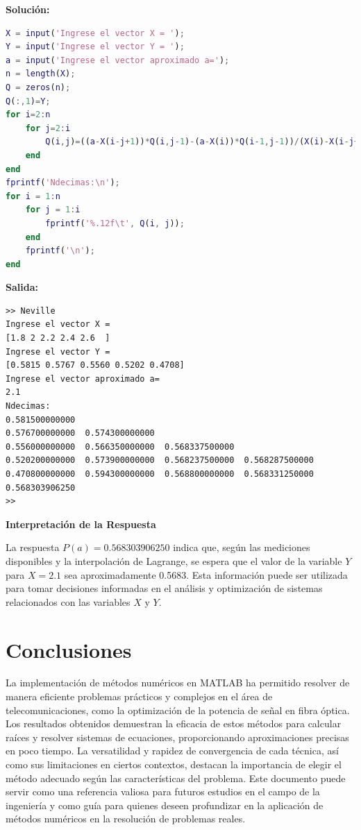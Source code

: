 \documentclass[12pt,a4paper,twoside]{article}  %
\begin{document}
\textbf{Solución:}
\begin{lstlisting}[language=Matlab]
X = input('Ingrese el vector X = ');
Y = input('Ingrese el vector Y = ');
a = input('Ingrese el vector aproximado a=');
n = length(X);
Q = zeros(n);
Q(:,1)=Y;
for i=2:n
    for j=2:i
        Q(i,j)=((a-X(i-j+1))*Q(i,j-1)-(a-X(i))*Q(i-1,j-1))/(X(i)-X(i-j+1));
    end
end
fprintf('Ndecimas:\n');
for i = 1:n
    for j = 1:i
        fprintf('%.12f\t', Q(i, j));
    end
    fprintf('\n');
end

\end{lstlisting}

\textbf{Salida:}

\begin{verbatim}
>> Neville
Ingrese el vector X = 
[1.8 2 2.2 2.4 2.6  ]
Ingrese el vector Y = 
[0.5815 0.5767 0.5560 0.5202 0.4708]
Ingrese el vector aproximado a=
2.1
Ndecimas:
0.581500000000	
0.576700000000	0.574300000000	
0.556000000000	0.566350000000	0.568337500000	
0.520200000000	0.573900000000	0.568237500000	0.568287500000	
0.470800000000	0.594300000000	0.568800000000	0.568331250000	0.568303906250	
>> 
\end{verbatim}

\textbf{Interpretación de la Respuesta}

La respuesta \(P(a) = 0.568303906250\) indica que, según las mediciones disponibles y la interpolación de Lagrange, se espera que el valor de la variable \(Y\) para \(X = 2.1\) sea aproximadamente 0.5683. Esta información puede ser utilizada para tomar decisiones informadas en el análisis y optimización de sistemas relacionados con las variables \(X\) y \(Y\).

\section{Conclusiones}

La implementación de métodos numéricos en MATLAB ha permitido resolver de manera eficiente problemas prácticos y complejos en el área de telecomunicaciones, como la optimización de la potencia de señal en fibra óptica. Los resultados obtenidos demuestran la eficacia de estos métodos para calcular raíces y resolver sistemas de ecuaciones, proporcionando aproximaciones precisas en poco tiempo. La versatilidad y rapidez de convergencia de cada técnica, así como sus limitaciones en ciertos contextos, destacan la importancia de elegir el método adecuado según las características del problema. Este documento puede servir como una referencia valiosa para futuros estudios en el campo de la ingeniería y como guía para quienes deseen profundizar en la aplicación de métodos numéricos en la resolución de problemas reales.
\end{document}
